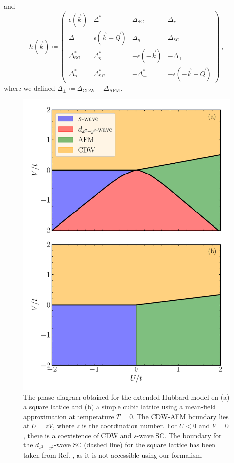 \documentclass[
    reprint, 
    aps,
    preprintnumbers,
    twocolumn,
    prb,
    superscriptaddress
]{revtex4-2}
\newcommand{\vk}{\vec{k}}
\newcommand{\vQ}{\vec{Q}}
\begin{document}
and 
\begin{equation}
    h(\vk) \coloneqq  \begin{pmatrix}
        \epsilon (\vk) & \Delta_-^* & \Delta_\text{SC} & \Delta_\eta \\
        \Delta_- & \epsilon (\vk + \vQ) & \Delta_\eta & \Delta_\text{SC} \\
        \Delta_\text{SC}^* & \Delta_\eta^* & - \epsilon (-\vk) & - \Delta_+ \\
        \Delta_\eta^* & \Delta_\text{SC}^* & - \Delta_+^* & - \epsilon (-\vk - \vQ)
        \end{pmatrix}\,,
\end{equation}
where we defined $\Delta_\pm \coloneqq \Delta_\text{CDW} \pm \Delta_\text{AFM}$.

\begin{figure}
    \centering
    \includegraphics[width=.48\textwidth]{plots/phase_diagram.pdf}
    \caption{The phase diagram obtained for the extended Hubbard model on 
    (a) a square lattice and (b) a simple cubic lattice using a mean-field approximation at temperature $T=0$.
    The CDW-AFM boundary lies at $U = zV$, where $z$ is the coordination number. 
    For $U<0$ and $V=0$, there is a coexistence of CDW and $s$-wave SC.
    The boundary for the $d_{x^2 - y^2}$-wave SC (dashed line) for the square lattice has been taken from Ref. \cite{Micnas88b}, 
    as it is not accessible using our formalism.}
    \label{fig:phase_diagram}
\end{figure}
\end{document}
